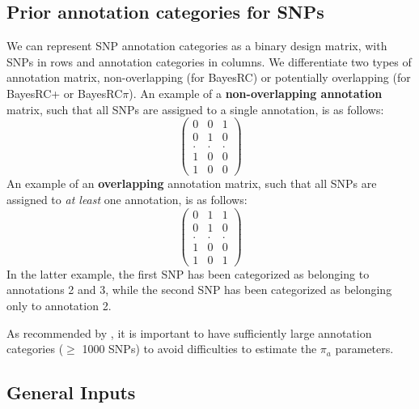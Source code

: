 \documentclass{ol-softwaremanual}
\begin{document}
\subsection{Prior annotation categories for SNPs}

We can represent SNP annotation categories as a binary design matrix, with SNPs in rows and annotation categories in columns. We differentiate two types of annotation matrix, non-overlapping (for BayesRC) or potentially overlapping (for BayesRC+ or BayesRC$\pi$). An example of a \textbf{non-overlapping annotation} matrix, such that all SNPs are assigned to a single annotation, is as follows:
\[\begin{pmatrix}
0 & 0 & 1\\
0 & 1 & 0\\
. & . & . \\
1 & 0 & 0 \\
1 & 0 & 0
\end{pmatrix}\]
An example of an \textbf{overlapping} annotation matrix, such that all SNPs are assigned to {\it at least} one annotation, is as follows: 
\[\begin{pmatrix}
0 & 1 & 1\\
0 & 1 & 0\\
. & . & . \\
1 & 0 & 0 \\
1 & 0 & 1
\end{pmatrix}\]
In the latter example, the first SNP has been categorized as belonging to annotations 2 and 3, while the second SNP has been categorized as belonging only to annotation 2.

As recommended by \citet{macleod_exploiting_2016}, it is important to have sufficiently large annotation categories ($\geq$ 1000 SNPs) to avoid difficulties to estimate the $\pi_a$ parameters.

\subsection{General Inputs}
\end{document}
